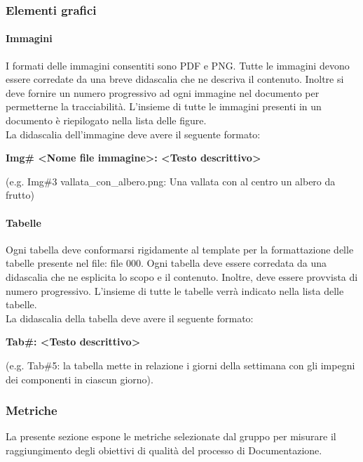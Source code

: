 		\subsubsection{Elementi grafici}
			\paragraph{Immagini}
				I formati delle immagini consentiti sono PDF e PNG. Tutte le immagini devono essere corredate da una breve didascalia che ne descriva il contenuto. Inoltre si deve fornire un numero progressivo ad ogni immagine nel documento per permetterne la tracciabilità. L’insieme di tutte le immagini presenti in un documento è riepilogato nella lista delle figure. \\
				La didascalia dell’immagine deve avere il seguente formato:
				\begin{center}
					\textbf{Img\#<numero progressivo immagine> <Nome file immagine>: <Testo descrittivo>}
				\end{center}
				(e.g.  Img\#3 vallata\_con\_albero.png: Una vallata con al centro un albero da frutto)
			\paragraph{Tabelle}
				Ogni tabella deve conformarsi rigidamente al template per la formattazione delle tabelle presente nel file: file 000. Ogni tabella deve essere corredata da una didascalia che ne esplicita lo scopo e il contenuto. Inoltre, deve essere provvista di numero progressivo. L’insieme di tutte le tabelle verrà indicato nella lista delle tabelle. \\
				La didascalia della tabella deve avere il seguente formato: \\
				\begin{center}
					\textbf{Tab\#<numero progressivo tabella>: <Testo descrittivo>}
				\end{center}
				(e.g. Tab\#5: la tabella mette in relazione i giorni della settimana con gli impegni dei componenti in ciascun giorno).

		\subsubsection{Metriche}
			La presente sezione espone le metriche selezionate dal gruppo per misurare il raggiungimento degli obiettivi di qualità del processo di Documentazione. \\
